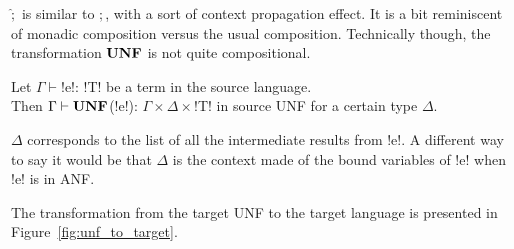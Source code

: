 $\widehat{;}$ is similar to $;$, with a sort of context propagation effect. 
It is a bit reminiscent of monadic composition versus the usual composition.
Technically though, the transformation $\mathbf{UNF}$ is not quite compositional.

\begin{proposition}
    Let $\Gamma\vdash$!e!: !T! be a term in the source language.\\
    Then $\Gamma \vdash \mathbf{UNF}$(!e!): $\Gamma\times\Delta\times$!T! in source UNF for a certain type $\Delta$. 
\end{proposition}

$\Delta$ corresponds to the list of all the intermediate results from !e!. 
A different way to say it would be that $\Delta$ is the context made of the bound variables of !e! when !e! is in ANF.



The transformation from the target UNF to the target language is presented in Figure~\ref{fig:unf_to_target}.


